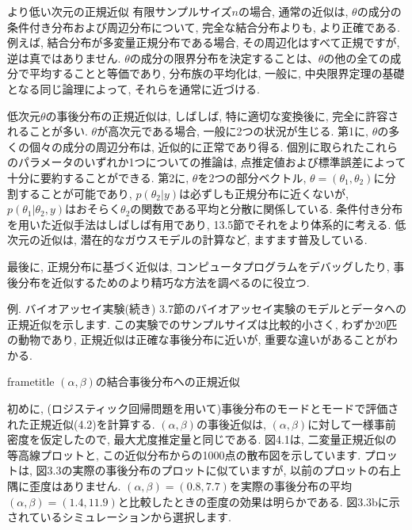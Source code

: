 \documentclass[10pt,dvipdfmx,a4]{beamer}
\newcommand{\dbox}[1]{\begin{beamercolorbox}[wd=122mm, sep=0pt, shadow=false, rounded=false]{frametitle} { #1}\end{beamercolorbox}}
\begin{document}
\begin{frame}{より低い次元の正規近似}
有限サンプルサイズ$n$の場合, 通常の近似は, $\theta$の成分の条件付き分布および周辺分布について, 完全な結合分布よりも, より正確である.
例えば, 結合分布が多変量正規分布である場合, その周辺化はすべて正規ですが, 逆は真ではありません.
$\theta$の成分の限界分布を決定することは、$\theta$の他の全ての成分で平均することと等価であり, 分布族の平均化は, 一般に, 中央限界定理の基礎となる同じ論理によって, それらを通常に近づける.

低次元$\theta$の事後分布の正規近似は, しばしば, 特に適切な変換後に, 完全に許容されることが多い.
$\theta$が高次元である場合, 一般に2つの状況が生じる.
第1に, $\theta$の多くの個々の成分の周辺分布は, 近似的に正常であり得る.
個別に取られたこれらのパラメータのいずれか1つについての推論は, 点推定値および標準誤差によって十分に要約することができる.
第2に, $\theta$を2つの部分ベクトル, $\theta=(\theta_1, \theta_2)$に分割することが可能であり, $p(\theta_2|y)$は必ずしも正規分布に近くないが, $p(\theta_1|\theta_2, y)$はおそらく$\theta_2$の関数である平均と分散に関係している.
条件付き分布を用いた近似手法はしばしば有用であり, 13.5節でそれをより体系的に考える.
低次元の近似は, 潜在的なガウスモデルの計算など, ますます普及している.

最後に, 正規分布に基づく近似は, コンピュータプログラムをデバッグしたり, 事後分布を近似するためのより精巧な方法を調べるのに役立つ.
\end{frame}


\begin{frame}{例. バイオアッセイ実験(続き)}
3.7節のバイオアッセイ実験のモデルとデータへの正規近似を示します.
この実験でのサンプルサイズは比較的小さく, わずか20匹の動物であり, 正規近似は正確な事後分布に近いが, 重要な違いがあることがわかる.

\dbox{$(\alpha,\beta)$の結合事後分布への正規近似}

初めに, (ロジスティック回帰問題を用いて)事後分布のモードとモードで評価された正規近似(4.2)を計算する.
$(\alpha,\beta)$の事後近似は, $(\alpha,\beta)$に対して一様事前密度を仮定したので, 最大尤度推定量と同じである.
図4.1は, 二変量正規近似の等高線プロットと, この近似分布からの1000点の散布図を示しています.
プロットは, 図3.3の実際の事後分布のプロットに似ていますが, 以前のプロットの右上隅に歪度はありません.
$(\alpha,\beta)=(0.8, 7.7)$を実際の事後分布の平均$(\alpha,\beta)=(1.4, 11.9)$と比較したときの歪度の効果は明らかである.
図3.3bに示されているシミュレーションから選択します.
\end{frame}
\end{document}

